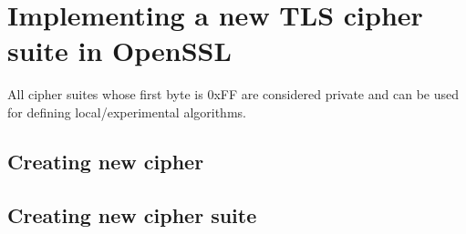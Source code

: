 \chapter{Implementing a new TLS cipher suite in OpenSSL}


All cipher suites whose first byte is 0xFF are considered private and can be used for defining local/experimental algorithms. \cite[p.~55]{rfc2246}



\section{Creating new cipher}

\section{Creating new cipher suite}
